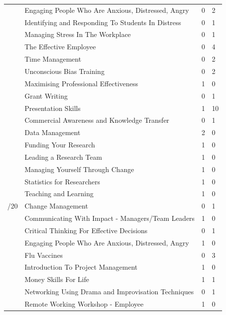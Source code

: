 \begin{mdframed}
\begin{longtable}{p{2cm}
                p{9.5cm}
                !{\qquad}
                R{1cm}
                R{1cm}}
    & Engaging People Who Are Anxious, Distressed, Angry & 0 & 2 \\
    & Identifying and Responding To Students In Distress & 0 & 1 \\
    & Managing Stress In The Workplace & 0 & 1 \\
    & The Effective Employee & 0 & 4 \\
    & Time Management & 0 & 2 \\
    & Unconscious Bias Training & 0 & 2 \\
    & Maximising Professional Effectiveness & 1 & 0 \\
    & Grant Writing & 0 & 1 \\
    & Presentation Skills & 1 & 10\\
    & Commercial Awareness and Knowledge Transfer & 0 & 1 \\
    & Data Management & 2 & 0 \\
    & Funding Your Research & 1 & 0 \\
    & Leading a Research Team & 1 & 0 \\
    & Managing Yourself Through Change & 1 & 0 \\
    & Statistics for Researchers & 1 & 0 \\
    & Teaching and Learning & 1 & 0 \\
    /20 & Change Management & 0 & 1 \\
    & Communicating With Impact - Managers/Team Leaders & 1 & 0\\
    & Critical Thinking For Effective Decisions & 0 & 1 \\
    & Engaging People Who Are Anxious, Distressed, Angry & 1 & 0 \\
    & Flu Vaccines & 0 & 3 \\
    & Introduction To Project Management & 1 & 0 \\
    & Money Skills For Life & 1 & 1 \\
    & Networking Using Drama and Improvisation Techniques & 0 & 1 \\
    & Remote Working Workshop - Employee & 1 & 0\\

\end{longtable}
\end{mdframed}
